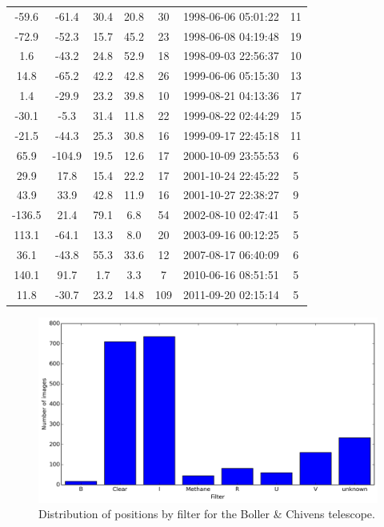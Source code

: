 \documentclass[12pt,a4paper]{report}
\newcommand{\BC}{Boller \& Chivens }
\begin{document}
\begin{longtable}{|c|c|c|c|c|c|c|}
-59.6 & -61.4 & 30.4 & 20.8 &  30 & 1998-06-06 05:01:22 &  11 \\
-72.9 & -52.3 & 15.7 & 45.2 &  23 & 1998-06-08 04:19:48 &  19 \\
1.6 & -43.2 & 24.8 & 52.9 &  18 & 1998-09-03 22:56:37 &  10 \\
14.8 & -65.2 & 42.2 & 42.8 &  26 & 1999-06-06 05:15:30 &  13 \\
1.4 & -29.9 & 23.2 & 39.8 &  10 & 1999-08-21 04:13:36 &  17 \\
-30.1 & -5.3 & 31.4 & 11.8 &  22 & 1999-08-22 02:44:29 &  15 \\
-21.5 & -44.3 & 25.3 & 30.8 &  16 & 1999-09-17 22:45:18 &  11 \\
65.9 & -104.9 & 19.5 & 12.6 &  17 & 2000-10-09 23:55:53 &   6 \\
29.9 & 17.8 & 15.4 & 22.2 &  17 & 2001-10-24 22:45:22 &   5 \\
43.9 & 33.9 & 42.8 & 11.9 &  16 & 2001-10-27 22:38:27 &   9 \\
-136.5 & 21.4 & 79.1 & 6.8 &  54 & 2002-08-10 02:47:41 &   5 \\
113.1 & -64.1 & 13.3 & 8.0 &  20 & 2003-09-16 00:12:25 &   5 \\
36.1 & -43.8 & 55.3 & 33.6 &  12 & 2007-08-17 06:40:09 &   6 \\
140.1 & 91.7 & 1.7 & 3.3 &   7 & 2010-06-16 08:51:51 &   5 \\
11.8 & -30.7 & 23.2 & 14.8 & 109 & 2011-09-20 02:15:14 &   5 \\
\hline
\end{longtable}



\begin{figure}
\includegraphics[width=16.0cm]{filtro_IAG.png} 
\caption{Distribution of positions by filter for the \BC telescope.}
\label{Fig:filtro-IAG}
\end{figure}
\end{document}
